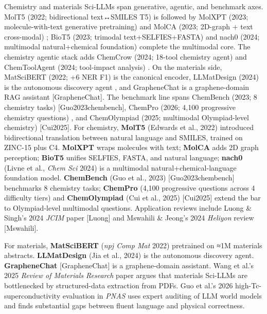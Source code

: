 \documentclass{article}
\begin{document}
Chemistry and materials Sci-LLMs span generative, agentic, and benchmark axes. MolT5 (2022; bidirectional text↔SMILES T5) \cite{edwards2022emnlp2022} is followed by MolXPT (2023; molecule-with-text generative pretraining) \cite{liu2023acl2023} and MolCA (2023; 2D-graph + text cross-modal) \cite{liu2023emnlp2023}; BioT5 (2023; trimodal text+SELFIES+FASTA) \cite{pei2023emnlp2023} and nach0 (2024; multimodal natural+chemical foundation) \cite{livne2024nach0multimodalnat} complete the multimodal core. The chemistry agentic stack adds ChemCrow (2024; 18-tool chemistry agent) \cite{bran2024naturemachineintel} and ChemToolAgent (2024; tool-impact analysis) \cite{yu2024chemtoolagenttheim}. On the materials side, MatSciBERT (2022; +6 NER F1) \cite{gupta2022matscibertamateria} is the canonical encoder, LLMatDesign (2024) is the autonomous discovery agent \cite{jia2024arxiv2406131632024}, and GrapheneChat is a graphene-domain RAG assistant {[}GrapheneChat{]}. The benchmark line spans ChemBench (2023; 8 chemistry tasks) {[}Guo2023chembench{]}, ChemPro (2026; 4,100 progressive chemistry questions) \cite{baranwal2026arxiv2602031082026}, and ChemOlympiad (2025; multimodal Olympiad-level chemistry) {[}Cui2025{]}. For chemistry, \textbf{MolT5} (Edwards et al., 2022) \cite{edwards2022emnlp2022} introduced bidirectional translation between natural language and SMILES, trained on ZINC-15 plus C4. \textbf{MolXPT} \cite{liu2023acl2023} wraps molecules with text; \textbf{MolCA} \cite{liu2023emnlp2023} adds 2D graph perception; \textbf{BioT5} \cite{pei2023emnlp2023} unifies SELFIES, FASTA, and natural language; \textbf{nach0} (Livne et al., \emph{Chem Sci} 2024) \cite{livne2024nach0multimodalnat} is a multimodal natural+chemical-language foundation model. \textbf{ChemBench} (Guo et al., 2023) {[}Guo2023chembench{]} benchmarks 8 chemistry tasks; \textbf{ChemPro} (4,100 progressive questions across 4 difficulty tiers) \cite{baranwal2026arxiv2602031082026} and \textbf{ChemOlympiad} (Cui et al., 2025) {[}Cui2025{]} extend the bar to Olympiad-level multimodal questions. Application reviews include Luong \& Singh's 2024 \emph{JCIM} paper {[}Luong{]} and Mswahili \& Jeong's 2024 \emph{Heliyon} review {[}Mswahili{]}.

For materials, \textbf{MatSciBERT} (\emph{npj Comp Mat} 2022) \cite{gupta2022matscibertamateria} pretrained on ≈1M materials abstracts. \textbf{LLMatDesign} (Jia et al., 2024) \cite{jia2024arxiv2406131632024} is the autonomous discovery agent. \textbf{GrapheneChat} {[}GrapheneChat{]} is a graphene-domain assistant. Wang et al.'s 2025 \emph{Review of Materials Research} paper \cite{wang2025knowledgeguidedlar} argues that materials Sci-LLMs are bottlenecked by structured-data extraction from PDFs. Guo et al.'s 2026 high-Tc-superconductivity evaluation in \emph{PNAS} \cite{guo2026expertevaluationof} uses expert auditing of LLM world models and finds substantial gaps between fluent language and physical correctness.
\end{document}
